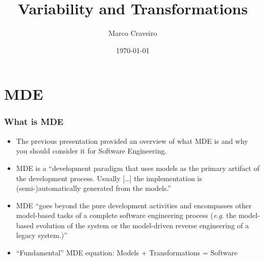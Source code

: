 \documentclass{beamer}
\title{Variability and Transformations}
\author{Marco Craveiro}
\date{\today}
\newcommand{\eg}{\textit{e}.\textit{g}. }
\begin{document}

\section{\ac{MDE}}

\begin{frame}
\frametitle{What is \ac{MDE}}

\begin{itemize}
\item The previous presentation provided an overview of what \ac{MDE}
  is and why you should consider it for Software Engineering.

\pause

\item \ac{MDE} is a ``development paradigm that uses models as the
  primary artifact of the development process. Usually [\ldots] the
  implementation is (semi-)automatically generated from the
  models.''\cite{brambilla2012model}

\pause

\item \ac{MDE} ``goes beyond the pure development activities and
  encompasses other model-based tasks of a complete software
  engineering process (\eg the model-based evolution of the system or
  the model-driven reverse engineering of a legacy
  system.)''\cite{brambilla2012model}

\pause

\item ``Fundamental'' \ac{MDE} equation: Models + Transformations =
  Software

\end{itemize}

\end{frame}
\end{document}
